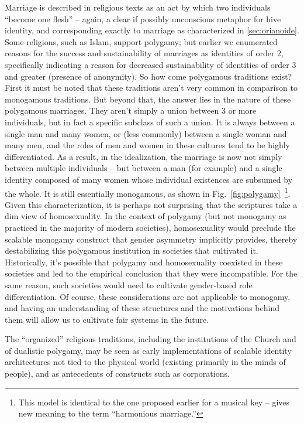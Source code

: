 \documentclass[pra,twocolumn,groupedaddress,10pt]{revtex4}
\theoremstyle{definition}
\begin{document}
Marriage is described in religious texts as an act by which two individuals ``become one flesh''\cite{torahmarriage}\cite{biblemarriage} -- again, a clear if possibly unconscious metaphor for hive identity, and corresponding exactly to marriage as characterized in \autoref{sec:orianoide}. Some religions, such as Islam\cite{quranmarriage}, support polygamy; but earlier we enumerated reasons for the success and sustainability of marriages as identities of order $2$, specifically indicating a reason for decreased sustainability of identities of order $3$ and greater (presence of anonymity). So how come polygamous traditions exist? First it must be noted that these traditions aren't very common in comparison to monogamous traditions. But beyond that, the answer lies in the nature of these polygamous marriages. They aren't simply a union between $3$ or more individuals, but in fact a specific subclass of such a union. It is always between a single man and many women, or (less commonly) between a single woman and many men, and the roles of men and women in these cultures tend to be highly differentiated. As a result, in the idealization, the marriage is now not simply between multiple individuals -- but between a man (for example) and a single identity composed of many women whose individual existences are subsumed by the whole. It is still essentially monogamous, as shown in Fig.~\ref{fig:polygamy}~\footnote{This model is identical to the one proposed earlier for a musical key -- gives new meaning to the term ``harmonious marriage.''}. Given this characterization, it is perhaps not surprising that the scriptures take a dim view of homosexuality. In the context of polygamy (but not monogamy as practiced in the majority of modern societies), homosexuality would preclude the scalable monogamy construct that gender asymmetry implicitly provides, thereby destabilizing this polygamous institution in societies that cultivated it. Historically, it's possible that polygamy and homosexuality coexisted in these societies and led to the empirical conclusion that they were incompatible. For the same reason, such societies would need to cultivate gender-based role differentiation. Of course, these considerations are not applicable to monogamy, and having an understanding of these structures and the motivations behind them will allow us to cultivate fair systems in the future.

The ``organized'' religious traditions, including the institutions of the Church and of dualistic polygamy, may be seen as early implementations of scalable identity architectures not tied to the physical world (existing primarily in the minds of people), and as antecedents of constructs such as corporations.
\end{document}
